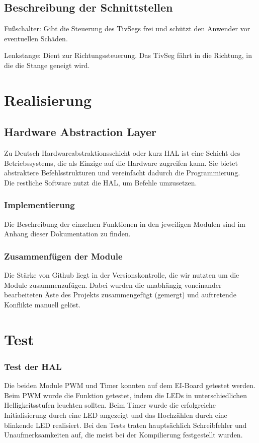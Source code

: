 \documentclass[a4paper,10pt,twoside]{report}
\begin{document}
\begin{itemize}
\end{itemize}


\section{Beschreibung der Schnittstellen}

Fußschalter:
Gibt die Steuerung des TivSegs frei und schützt den Anwender vor eventuellen Schäden.

Lenkstange:
Dient zur Richtungssteuerung.
Das TivSeg fährt in die Richtung, in die die Stange geneigt wird.

\chapter{Realisierung}
\section{Hardware Abstraction Layer}
Zu Deutsch Hardwareabstraktionsschicht oder kurz HAL ist eine Schicht des Betriebssystems, die als Einzige auf die Hardware zugreifen kann. Sie bietet abstraktere Befehlsstrukturen und vereinfacht dadurch die Programmierung.\\
Die restliche Software nutzt die HAL, um Befehle umzusetzen.

\subsection{Implementierung}
Die Beschreibung der einzelnen Funktionen in den jeweiligen Modulen sind im Anhang dieser Dokumentation zu finden.
 
\subsection{Zusammenfügen der Module}
Die Stärke von Github liegt in der Versionskontrolle, die wir nutzten um die Module zusammenzufügen. Dabei wurden die unabhängig voneinander bearbeiteten Äste des Projekts zusammengefügt (gemergt) und auftretende Konflikte manuell gelöst.

\chapter{Test}

\subsection{Test der HAL}
Die beiden Module PWM und Timer konnten auf dem EI-Board getestet werden. Beim PWM wurde die Funktion getestet, indem die LEDs in unterschiedlichen Helligkeitsstufen leuchten sollten. Beim Timer wurde die erfolgreiche Initialisierung durch eine LED angezeigt und das Hochzählen durch eine blinkende LED realisiert.
Bei den Tests traten hauptsächlich Schreibfehler und Unaufmerksamkeiten auf, die meist bei der Kompilierung festgestellt wurden.
\end{document}
